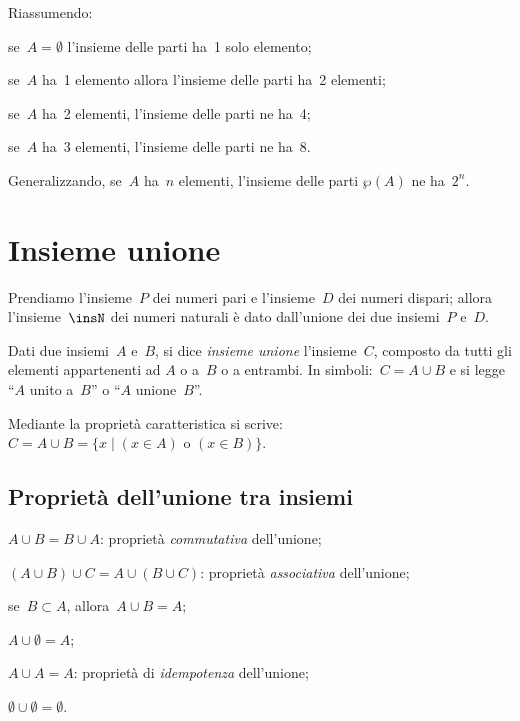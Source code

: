  Riassumendo:
\begin{itemize*}
\item se~$A=\emptyset $ l'insieme delle parti ha~1 solo elemento;
\item se~$A$ ha~1 elemento allora l'insieme delle parti ha~2 elementi;
\item se~$A$ ha~2 elementi, l'insieme delle parti ne ha~4;
\item se~$A$ ha~3 elementi, l'insieme delle parti ne ha~8.
\end{itemize*}

Generalizzando, se~$A$ ha~$n$ elementi, l'insieme delle parti $\wp (A)$ ne ha~$2^{n}$.

\vspazio\ovalbox{\risolvii \ref{ese:5.47}, \ref{ese:5.48}, \ref{ese:5.49}, \ref{ese:5.50}, \ref{ese:5.51}}

\section{Insieme unione}

Prendiamo l'insieme~$P$ dei numeri pari e l'insieme~$D$ dei numeri dispari; allora
l'insieme~$\insN$ dei numeri naturali è dato dall'unione dei due insiemi~$P$ e~$D$.

\begin{definizione}
Dati due insiemi~$A$ e~$B$, si dice
\emph{insieme unione} l'insieme~$C$, composto da tutti gli elementi appartenenti ad
$A$ o a~$B$ o a entrambi.
In simboli:~$C=A\cup B$ e si legge ``$A$ unito a~$B$''
o ``$A$ unione~$B$''.
\end{definizione}
\begin{center}
 
\end{center}
Mediante la proprietà caratteristica si scrive:~$C=A\cup B=\{x\mid (x\in A)\text{ o }(x\in B)\}$.

\subsection{Proprietà dell'unione tra insiemi}

\begin{enumeratea}
\item $A\cup B=B\cup A$: proprietà \emph{commutativa} dell'unione;
\item $(A\cup B)\cup C=A\cup (B\cup C)$: proprietà \emph{associativa} dell'unione;
\item se~$B\subset A$, allora~$A\cup B=A$;
\item $A\cup \emptyset =A$;
\item $A\cup A=A$: proprietà di \emph{idempotenza} dell'unione;
\item $\emptyset \cup \emptyset = \emptyset $.
\end{enumeratea}

